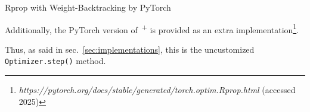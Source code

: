 \begin{subsection}{Rprop with Weight-Backtracking by PyTorch}
    \par Additionally, the PyTorch version of~\textsuperscript{+} is provided as an extra implementation\footnote{\textit{https://pytorch.org/docs/stable/generated/torch.optim.Rprop.html} (accessed 2025)}.
    \par Thus, as said in sec.~\ref{sec:implementations}, this is the uncustomized \texttt{Optimizer.step()} method.
\end{subsection}
\clearpage